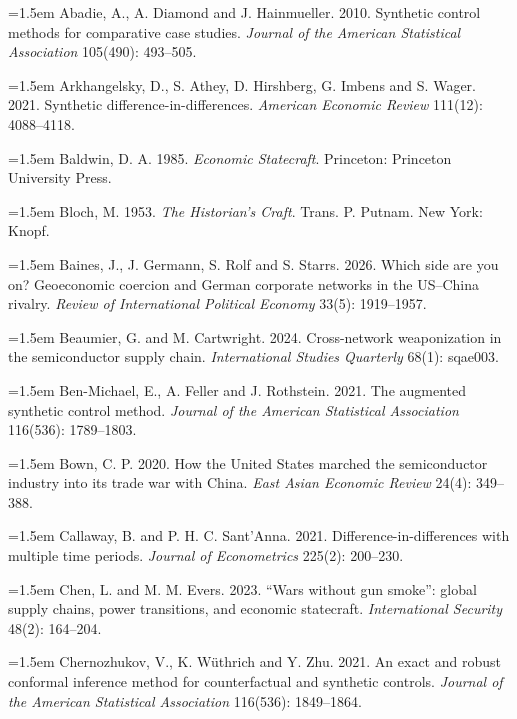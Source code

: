 \documentclass[12pt]{article}
\begin{document}
\par\noindent\hangindent=1.5em 
  Abadie, A., A. Diamond and J. Hainmueller. 2010. Synthetic control methods for comparative case studies. \emph{Journal of the American Statistical Association} 105(490): 493--505.
\par\noindent\hangindent=1.5em 
  Arkhangelsky, D., S. Athey, D. Hirshberg, G. Imbens and S. Wager. 2021. Synthetic difference-in-differences. \emph{American Economic Review} 111(12): 4088--4118.
\par\noindent\hangindent=1.5em 
  Baldwin, D. A. 1985. \emph{Economic Statecraft}. Princeton: Princeton University Press.
\par\noindent\hangindent=1.5em 
  Bloch, M. 1953. \emph{The Historian's Craft}. Trans. P. Putnam. New York: Knopf.
\par\noindent\hangindent=1.5em 
  Baines, J., J. Germann, S. Rolf and S. Starrs. 2026. Which side are you on? Geoeconomic coercion and German corporate networks in the US--China rivalry. \emph{Review of International Political Economy} 33(5): 1919--1957.
\par\noindent\hangindent=1.5em 
  Beaumier, G. and M. Cartwright. 2024. Cross-network weaponization in the semiconductor supply chain. \emph{International Studies Quarterly} 68(1): sqae003.
\par\noindent\hangindent=1.5em 
  Ben-Michael, E., A. Feller and J. Rothstein. 2021. The augmented synthetic control method. \emph{Journal of the American Statistical Association} 116(536): 1789--1803.
\par\noindent\hangindent=1.5em 
  Bown, C. P. 2020. How the United States marched the semiconductor industry into its trade war with China. \emph{East Asian Economic Review} 24(4): 349--388.
\par\noindent\hangindent=1.5em 
  Callaway, B. and P. H. C. Sant'Anna. 2021. Difference-in-differences with multiple time periods. \emph{Journal of Econometrics} 225(2): 200--230.
\par\noindent\hangindent=1.5em 
  Chen, L. and M. M. Evers. 2023. ``Wars without gun smoke'': global supply chains, power transitions, and economic statecraft. \emph{International Security} 48(2): 164--204.
\par\noindent\hangindent=1.5em 
  Chernozhukov, V., K. Wüthrich and Y. Zhu. 2021. An exact and robust conformal inference method for counterfactual and synthetic controls. \emph{Journal of the American Statistical Association} 116(536): 1849--1864.
\end{document}
